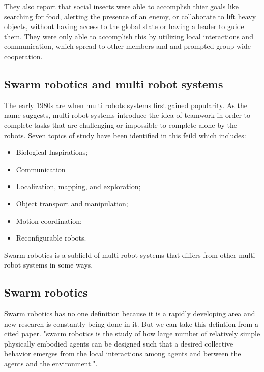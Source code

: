 \documentclass[12pt]{extarticle}
\begin{document}
They also report that social insects were able to accomplish thier goals like searching for food, alerting the presence of an enemy, or collaborate to lift heavy objects, without having access to the global state or having a leader to guide them. They were only able to accomplish this by utilizing local interactions and communication, which spread to other members and and prompted group-wide cooperation.\cite{navarro2013introduction} 



\subsection{Swarm robotics and multi robot systems}
The early 1980s are when multi robots systems first gained popularity.
As the name suggests, multi robot systems introduce the idea of teamwork in order to complete tasks that are challenging or impossible to complete alone by the robots.
Seven topics of study have been identified in this feild which includes:
\begin{itemize}
  \item  Biological Inspirations; 
  \item Communication
  \item Localization, mapping, and exploration;
  \item Object transport and manipulation;
  \item Motion coordination; 
  \item Reconfigurable robots.
\end{itemize}
Swarm robotics is a subfield of multi-robot systems that differs from other multi-robot systems in some ways.\cite{arai2002advances}
   


 

\subsection{Swarm robotics}
Swarm robotics has no one definition because it is a rapidly developing area and new research is constantly being done in it. But we can take this defintion from a cited paper.
"swarm robotics is the study of how large number of relatively simple physically embodied agents can be
designed such that a desired collective behavior emerges from the local interactions among agents
and between the agents and the environment."\cite{csahin2005swarm}.\\
\end{document}
